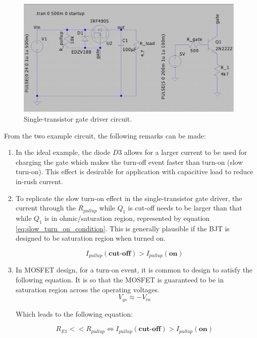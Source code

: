 \documentclass[../main.tex]{subfiles}
\begin{document}
    \begin{figure}[!h]
        \centerline{\includegraphics[width=\linewidth]{media/pmos_switch_npn.png}}
        \caption{Single-transistor gate driver circuit.} 
        \label{fig:single_transistor_gate_drive}
    \end{figure}

    \justify
    From the two example circuit, the following remarks can be made:
    \begin{enumerate}
        \item In the ideal example, the diode $D3$ allows for a larger current to be used for charging the gate which makes the turn-off event faster than turn-on (slow turn-on). This effect is desirable for application with capacitive load to reduce in-rush current.

        \item To replicate the slow turn-on effect in the single-transistor gate driver, the current through the $R_{pullup}$ while $Q_1$ is cut-off needs to be larger than that while $Q_1$ is in ohmic/saturation region, represented by equation \eqref{eq:slow_turn_on_condition}. This is generally plausible if the BJT is designed to be saturation region when turned on.
        
        \begin{equation} \label{eq:slow_turn_on_condition}
            I_{pullup}(\textbf{cut-off}) > I_{pullup}(\textbf{on})
        \end{equation}

        \item In MOSFET design, for a turn-on event, it is common to design to satisfy the following equation. It is so that the MOSFET is guaranteed to be in saturation region across the operating voltages.
        \begin{equation} \label{eq:deep_saturation_vgs}
            V_{gs} \approx -V_{in}
        \end{equation}

        Which leads to the following equation:

        \begin{equation} \label{eq:deep_saturation_condition}
            R_{E1} << R_{pullup} \Longleftrightarrow I_{pullup}(\textbf{cut-off}) > I_{pullup}(\textbf{on})
        \end{equation}
        
    \end{enumerate}
\end{document}
